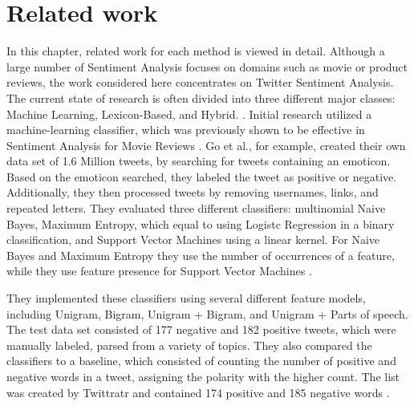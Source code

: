 \chapter{Related work}
\label{cha:Chapter2_RelatedWork}
\iffalse

Length: 1-2 pages

Effort: ~2 weeks

2-3 Arbeiten maximal, die genauer betrachtet werden
Ruhig mehr Zitate --> aber nicht detailliert betrachten
Introduction to Data Mining --> zu generell, nur als Zitat
Hier nur im engsten Sinne


Content
\begin{itemize}
\item Alec Go, Richa Bhayani, and Lei Huang. 2009. Twitter Sentiment Classification Using Distant Supervision.
Technical Report. Standford.
\item Taboada or Serendio or Vader?
\item Khuc et al.
\end{itemize}

\fi

In this chapter, related work for each method is viewed in detail. Although a large number of Sentiment Analysis focuses on domains such as movie or product reviews, the work considered here concentrates on Twitter Sentiment Analysis. The current state of research is often divided into three different major classes: Machine Learning, Lexicon-Based, and Hybrid. \cite{DBLP:journals/csur/GiachanouC16}. Initial research utilized a machine-learning classifier, which was previously shown to be effective in Sentiment Analysis for Movie Reviews \cite{GoBHaHua2009}. Go et al., for example, created their own data set of 1.6 Million tweets, by searching for tweets containing an emoticon. Based on the emoticon searched, they labeled the tweet as positive or negative. Additionally, they then processed tweets by removing usernames, links, and repeated letters. They evaluated three different classifiers: multinomial Naive Bayes, Maximum Entropy, which equal to using Logistc Regression in a binary classification, and Support Vector Machines using a linear kernel. For Naive Bayes and Maximum Entropy they use the number of occurrences of a feature, while they use feature presence for Support Vector Machines \cite{GoBHaHua2009}. 

They implemented these classifiers using several different feature models, including Unigram, Bigram, Unigram + Bigram, and Unigram + Parts of speech. The test data set consisted of 177 negative and 182 positive tweets, which were manually labeled, parsed from a variety of topics. They also compared the classifiers to a baseline, which consisted of counting the number of positive and negative words in a tweet, assigning the polarity with the higher count. The list was created by Twittratr and contained 174 positive and 185 negative words \cite{GoBHaHua2009}. 

